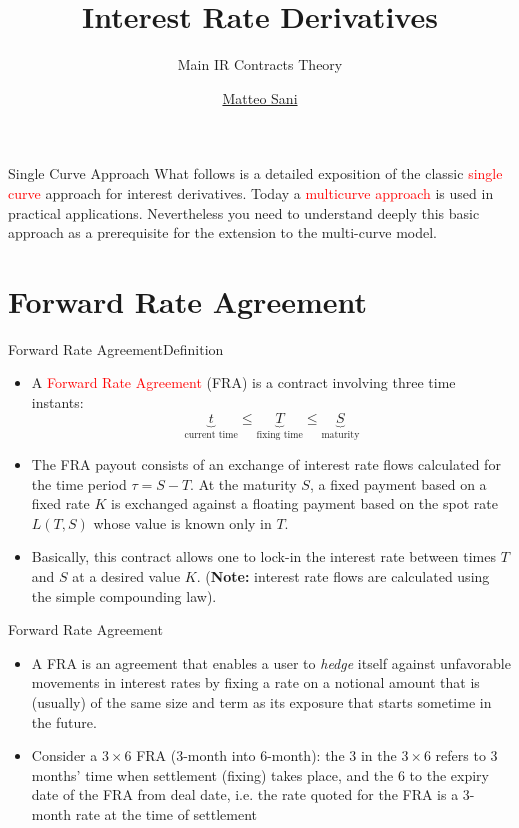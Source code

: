 \documentclass{beamer}
\title{Interest Rate Derivatives}
\subtitle{Main IR Contracts Theory}
\author{\href{mailto:matteo.sani@unisi.it}{Matteo Sani}}
\begin{document}
\begin{frame}[plain]
  \maketitle
\end{frame}

\begin{frame}{Single Curve Approach}
  What follows is a detailed exposition of the classic \textcolor{red}{single curve}
  approach for interest derivatives. Today a \textcolor{red}{multicurve approach} is
  used in practical applications. Nevertheless you need to understand
  deeply this basic approach as a prerequisite for the extension to the
  multi-curve model.
\end{frame}          

\section{Forward Rate Agreement}
\begin{frame}{Forward Rate Agreement}{Definition}
	\begin{itemize}	
		\item<1-> A \textcolor{red}{Forward Rate Agreement} (FRA) is a contract involving three time instants: %
		\begin{equation*}
			\underbrace{t}_{\text{current time}} \leq \underbrace{T}_{\text{fixing time}} \leq\underbrace{S}_{\text{maturity}}
		\end{equation*}
		\item<2-> The FRA payout consists of an exchange of interest rate flows calculated for the time period $\tau=S-T$. At the maturity $S$, a fixed payment based on a fixed rate $K$ is exchanged against a floating payment based on the spot rate $L(T, S)$ whose value is known only in $T$.
		\item<3-> Basically, this contract allows one to lock-in the interest rate between times $T$ and $S$ at a desired value $K$. (\textbf{Note:} interest rate flows are calculated using the simple compounding law).
	\end{itemize}
\end{frame}

\begin{frame}{Forward Rate Agreement}
	\begin{itemize}
	\item<1-> A FRA is an agreement that enables a user to \emph{hedge} itself against unfavorable movements in interest rates by fixing a rate on a notional amount that is (usually) of the same size and term as its exposure that starts sometime in the future. 
	\item<2-> Consider a $3\times 6$ FRA (3-month into 6-month): the 3 in the $3\times 6$ refers to 3 months' time when settlement (fixing) takes place, and the 6 to the expiry date of the FRA from deal date, i.e. the rate quoted for the FRA is a 3-month rate at the time of settlement
	\end{itemize}
\end{frame}
\end{document}
